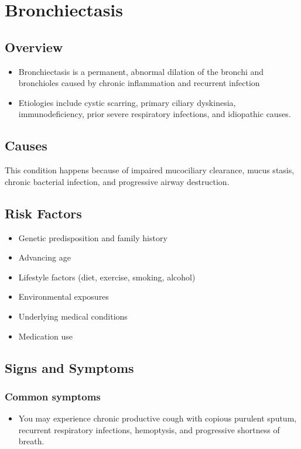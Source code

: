 \chapter{Bronchiectasis}
\label{sec:Bronchiectasis}

\section{Overview}


\begin{itemize}[noitemsep]
  \item Bronchiectasis is a permanent, abnormal dilation of the bronchi and bronchioles caused by chronic inflammation and recurrent infection
  \item Etiologies include cystic scarring, primary ciliary dyskinesia, immunodeficiency, prior severe respiratory infections, and idiopathic causes.
\end{itemize}
\section{Causes}
This condition happens because of impaired mucociliary clearance, mucus stasis, chronic bacterial infection, and progressive airway destruction.     
\section{Risk Factors}

\begin{itemize}[noitemsep]
  \item Genetic predisposition and family history
  \item Advancing age
  \item Lifestyle factors (diet, exercise, smoking, alcohol)
  \item Environmental exposures
  \item Underlying medical conditions
  \item Medication use
\end{itemize}
\section{Signs and Symptoms}

\subsection{Common symptoms}
\begin{itemize}[noitemsep]
  \item You may experience chronic productive cough with copious purulent sputum, recurrent respiratory infections, hemoptysis, and progressive shortness of breath. 
  \end{itemize}

